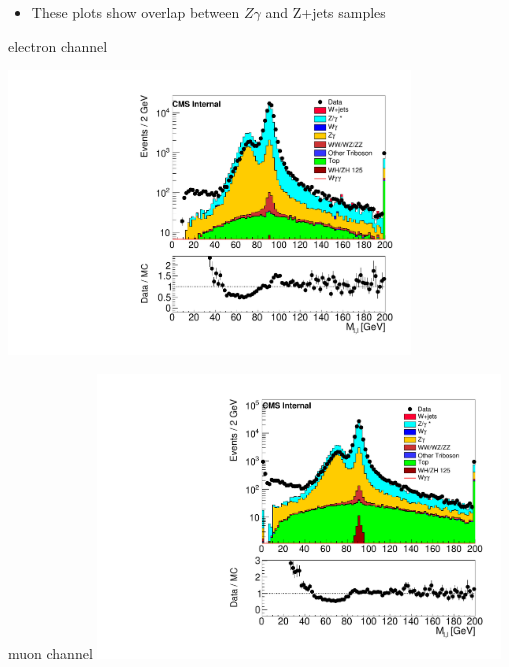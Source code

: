 \documentclass{beamer}
\begin{document}
 {

    \begin{itemize}
        \item These plots show overlap between $Z\gamma$ and Z+jets samples
    \end{itemize}

    \bc
     
         electron channel
             
         \includegraphics[width=0.8\textwidth]{Plots/m_leplep_2el1ph_noolaprm.pdf}



         muon channel
        \includegraphics[width=0.8\textwidth]{Plots/m_leplep_2mu1ph_noolaprm.pdf}

    \ec
}
\end{document}
